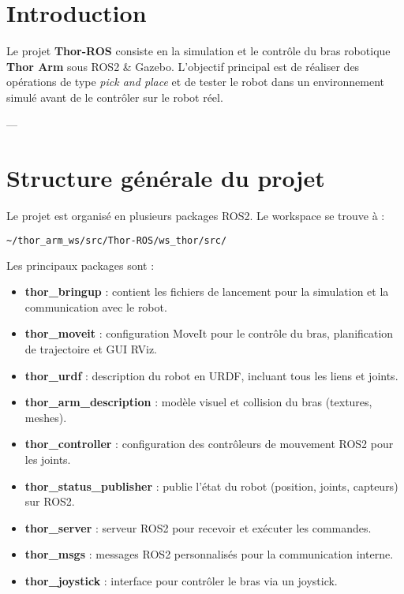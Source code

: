 \documentclass[a4paper,12pt]{article}
\numberwithin{equation}{section}
\begin{document}
\tableofcontents
\newpage

\section{Introduction}
Le projet \textbf{Thor-ROS} consiste en la simulation et le contrôle du bras robotique \textbf{Thor Arm} sous ROS2 \& Gazebo.  
L'objectif principal est de réaliser des opérations de type \textit{pick and place} et de tester le robot dans un environnement simulé avant de le contrôler sur le robot réel.  

---

\section{Structure générale du projet}

Le projet est organisé en plusieurs packages ROS2. Le workspace se trouve à :

\begin{lstlisting}[language=bash]
~/thor_arm_ws/src/Thor-ROS/ws_thor/src/
\end{lstlisting}

Les principaux packages sont :

\begin{itemize}
    \item \textbf{thor\_bringup} : contient les fichiers de lancement pour la simulation et la communication avec le robot.
    \item \textbf{thor\_moveit} : configuration MoveIt pour le contrôle du bras, planification de trajectoire et GUI RViz.
    \item \textbf{thor\_urdf} : description du robot en URDF, incluant tous les liens et joints.
    \item \textbf{thor\_arm\_description} : modèle visuel et collision du bras (textures, meshes).
    \item \textbf{thor\_controller} : configuration des contrôleurs de mouvement ROS2 pour les joints.
    \item \textbf{thor\_status\_publisher} : publie l'état du robot (position, joints, capteurs) sur ROS2.
    \item \textbf{thor\_server} : serveur ROS2 pour recevoir et exécuter les commandes.
    \item \textbf{thor\_msgs} : messages ROS2 personnalisés pour la communication interne.
    \item \textbf{thor\_joystick} : interface pour contrôler le bras via un joystick.
\end{itemize}
\end{document}
